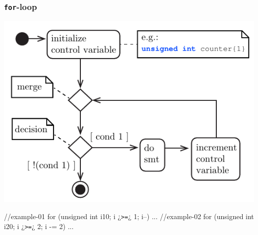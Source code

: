 \subsubsection{\texttt{for}-loop}
\begin{minipage}{.50\textwidth}
\centering
\includegraphics[width=0.80\linewidth]{01_Basics/figures/uml/IterationStatement-01-UML-for.pdf}
\label{fig:ch01_Basics_UML_IterationStatement-01-for}
\end{minipage}
\begin{minipage}{.415\textwidth}
\begin{CPPCode}
//example-01
for (unsigned int i{10}; i ¿\texttt{>=}¿ 1; i--) 
{...}
//example-02
for (unsigned int i{20}; i ¿\texttt{>=}¿ 2; i -= 2) 
{...}
\end{CPPCode}
\end{minipage}
\vspace{0.5cm}

